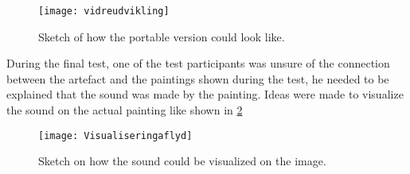 \begin{figure}[!h] 
\centering
\texttt{[image: vidreudvikling]}
\caption{\label{fig:vidreudvikling} Sketch of how the portable version could look like.}
\end{figure}




During the final test, one of the test participants was unsure of the connection between the artefact and the paintings shown during the test, he needed to be explained that the sound was made by the painting. Ideas were made to visualize the sound on the actual painting like shown in \ref{fig:Visualiseringaflyd} 

\begin{figure}[!h] 
\centering
\texttt{[image: Visualiseringaflyd]}
\caption{\label{fig:Visualiseringaflyd} Sketch on how the sound could be visualized on the image.}
\end{figure}
 
 
